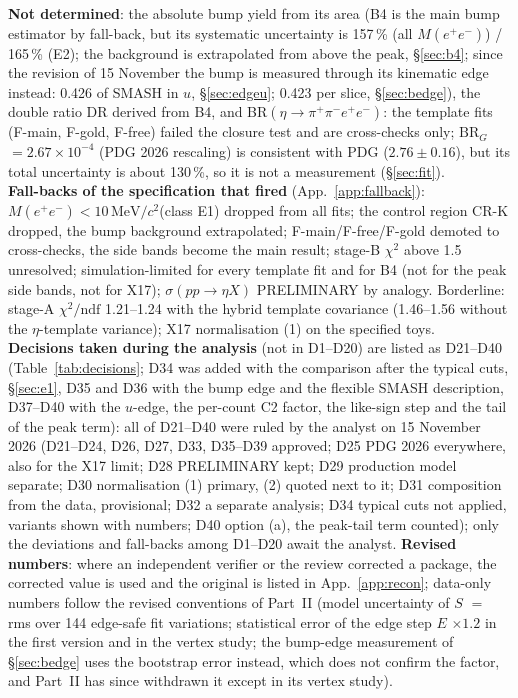 \documentclass[11pt,a4paper]{article}
\newcommand{\ppee}{\ensuremath{\pi^{+}\pi^{-}e^{+}e^{-}}\xspace}
\newcommand{\Mee}{\ensuremath{M(e^{+}e^{-})}\xspace}
\newcommand{\MeVcc}{\ensuremath{\mathrm{MeV}/c^{2}}\xspace}
\newcommand{\BRG}{\ensuremath{\mathrm{BR}_G}\xspace}
\newcommand{\sigeta}{\ensuremath{\sigma(pp\to\eta X)}\xspace}
\newcommand{\notebox}[1]{\par\noindent\colorbox{orange!10}{\parbox{\dimexpr\linewidth-2\fboxsep\relax}{#1}}\par}
\begin{document}
\notebox{\textbf{Not determined}: the absolute bump yield from its area (B4 is the main bump estimator by fall-back, but its systematic uncertainty is 157\,\% (all
\Mee) / 165\,\% (E2); the background is extrapolated from above the peak, \S\ref{sec:b4}; since the revision of 15 November the bump is
measured through its kinematic edge instead: 0.426 of SMASH in $u$, \S\ref{sec:edgeu}; 0.423 per slice, \S\ref{sec:bedge}), the double ratio DR derived from B4, and
BR$(\eta\to\ppee)$: the template fits (F-main, F-gold, F-free) failed the closure test and are cross-checks only; \BRG $=2.67\times10^{-4}$
(PDG 2026 rescaling) is consistent with PDG ($2.76\pm0.16$), but its total uncertainty is about 130\,\%, so it is not a measurement
(\S\ref{sec:fit}).\\[0.3em]
\textbf{Fall-backs of the specification that fired} (App.~\ref{app:fallback}): $\Mee<10$\,\MeVcc (class E1) dropped from all fits;
the control region CR-K dropped, the bump background extrapolated; F-main/F-free/F-gold demoted to cross-checks, the side bands
become the main result; stage-B $\chi^2$ above 1.5 unresolved; simulation-limited for every template fit and for B4 (not for the peak
side bands, not for X17); \sigeta PRELIMINARY by analogy. Borderline: stage-A $\chi^2/\mathrm{ndf}$ 1.21--1.24 with the hybrid template
covariance (1.46--1.56 without the $\eta$-template variance); X17 normalisation (1) on the specified toys.\\[0.3em]
\textbf{Decisions taken during the analysis} (not in D1--D20) are listed as D21--D40 (Table~\ref{tab:decisions}; D34 was added with the
comparison after the typical cuts, \S\ref{sec:e1}, D35 and D36 with the bump edge and the flexible SMASH description, D37--D40 with the $u$-edge,
the per-count C2 factor, the like-sign step and the tail of the peak term): all of D21--D40 were ruled by the analyst on 15 November 2026 (D21--D24,
D26, D27, D33, D35--D39 approved; D25 PDG 2026 everywhere, also for the X17 limit; D28 PRELIMINARY kept; D29 production model separate; D30
normalisation (1) primary, (2) quoted next to it; D31 composition from the data, provisional; D32 a separate analysis; D34 typical cuts not applied,
variants shown with numbers; D40 option (a), the peak-tail term counted); only the deviations and fall-backs among D1--D20 await the analyst. \textbf{Revised numbers}: where an independent verifier or the review corrected a package, the corrected value is used and the
original is listed in App.~\ref{app:recon}; data-only numbers follow the revised conventions of Part~II (model uncertainty of $S$ $=$ rms
over 144 edge-safe fit variations; statistical error of the edge step $E$ $\times1.2$ in the first version and in the vertex study; the bump-edge measurement of
\S\ref{sec:bedge} uses the bootstrap error instead, which does not confirm the factor, and Part~II has since withdrawn it except in its
vertex study).}
\end{document}
